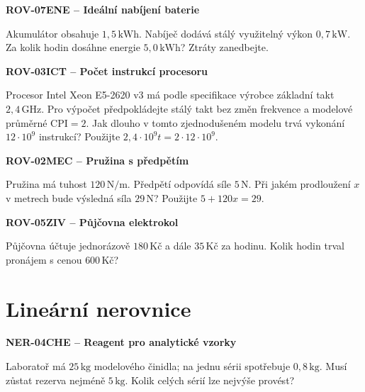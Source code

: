 \documentclass[11pt,a4paper]{article}
\begin{document}
\vspace{4mm}\par\noindent\dotfill\par\medskip
\par\medskip\noindent\textbf{ROV-07}\quad\textbf{ENE -- Ideální nabíjení baterie}\par
Akumulátor obsahuje $1{,}5\,\mathrm{kWh}$. Nabíječ dodává stálý využitelný výkon $0{,}7\,\mathrm{kW}$. Za kolik hodin dosáhne energie $5{,}0\,\mathrm{kWh}$? Ztráty zanedbejte.

\vspace{4mm}\par\noindent\dotfill\par\medskip
\par\medskip\noindent\textbf{ROV-03}\quad\textbf{ICT -- Počet instrukcí procesoru}\par
Procesor Intel Xeon E5-2620 v3 má podle specifikace výrobce základní takt $2{,}4\,\mathrm{GHz}$. Pro výpočet předpokládejte stálý takt bez změn frekvence a modelové průměrné $\mathrm{CPI}=2$. Jak dlouho v tomto zjednodušeném modelu trvá vykonání $12\cdot10^9$ instrukcí? Použijte $2{,}4\cdot10^9t=2\cdot12\cdot10^9$.

\vspace{4mm}\par\noindent\dotfill\par\medskip
\par\medskip\noindent\textbf{ROV-02}\quad\textbf{MEC -- Pružina s předpětím}\par
Pružina má tuhost $120\,\mathrm{N/m}$. Předpětí odpovídá síle $5\,\mathrm N$. Při jakém prodloužení $x$ v metrech bude výsledná síla $29\,\mathrm N$? Použijte $5+120x=29$.

\vspace{4mm}\par\noindent\dotfill\par\medskip
\par\medskip\noindent\textbf{ROV-05}\quad\textbf{ZIV -- Půjčovna elektrokol}\par
Půjčovna účtuje jednorázově $180\,\text{Kč}$ a dále $35\,\text{Kč}$ za hodinu. Kolik hodin trval pronájem s cenou $600\,\text{Kč}$?

\vspace{4mm}\par\noindent\dotfill\par\medskip

\section{Lineární nerovnice}
\par\medskip\noindent\textbf{NER-04}\quad\textbf{CHE -- Reagent pro analytické vzorky}\par
Laboratoř má $25\,\mathrm{kg}$ modelového činidla; na jednu sérii spotřebuje $0{,}8\,\mathrm{kg}$. Musí zůstat rezerva nejméně $5\,\mathrm{kg}$. Kolik celých sérií lze nejvýše provést?
\end{document}
